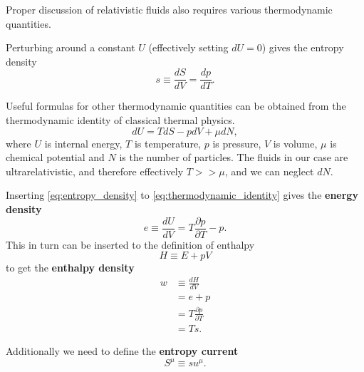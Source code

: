 \iffalse
The
\href{https://en.wikipedia.org/wiki/Clausius\%E2\%80\%93Clapeyron_relation}{Clausius-Clapeyron relation} states that
\cite[eq. 5.47, 5.48]{schroeder_thermal_2000}
\begin{equation}
\frac{dp}{dT} = \frac{L}{T \Delta V} = \frac{\Delta S}{\Delta V}.
\end{equation}
\fi

Proper discussion of relativistic fluids also requires various thermodynamic quantities.

Perturbing around a constant $U$ (effectively setting $dU=0$) gives the entropy density
\cite[p. 23]{lecture_notes}
\begin{equation}
s \equiv \frac{dS}{dV} = \frac{dp}{dT}.
\label{eq:entropy_density}
\end{equation}

Useful formulas for other thermodynamic quantities can be obtained from the thermodynamic identity of classical thermal physics.
\cites[eq. 2.136]{rezzolla_relativistic_2013}[eq. 3.68]{schroeder_thermal_2000}
\begin{equation}
dU = TdS - pdV + \mu dN,
\label{eq:thermodynamic_identity}
\end{equation}
where $U$ is internal energy, $T$ is temperature, $p$ is pressure, $V$ is volume, $\mu$ is chemical potential and $N$ is the number of particles.
The fluids in our case are ultrarelativistic, and therefore effectively $T >> \mu$,
and we can neglect $dN$.

Inserting \eqref{eq:entropy_density} to \eqref{eq:thermodynamic_identity} gives the \textbf{energy density}
\begin{equation}
e \equiv \frac{dU}{dV} = T \frac{\partial p}{\partial T} - p.
\end{equation}
This in turn can be inserted to the definition of enthalpy
\cite[eq. 1.51]{schroeder_thermal_2000}
\begin{equation}
H \equiv E + pV
\end{equation}
to get the \textbf{enthalpy density}
\begin{align}
w
&\equiv \frac{dH}{dV} \\
&= e+p \\
&= T \frac{\partial p}{\partial T} \\
&= Ts.
\end{align}
\iffalse
Additionally we need to define the \textbf{specific enthalpy} \cite[eq. 2.141]{rezzolla_relativistic_2013}
\begin{equation}
h = \frac{e+p}{\rho},
\label{eq:specific_enthalpy}
\end{equation}
where $\rho$ is the rest-mass density, and the \textbf{entropy current}
\fi
Additionally we need to define the \textbf{entropy current}
\cite[p. 23]{lecture_notes}
\begin{equation}
S^\mu \equiv su^\mu.
\end{equation}




